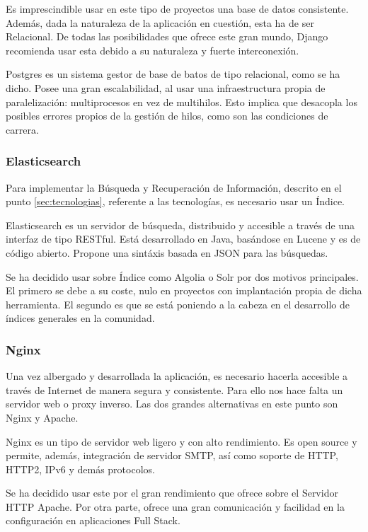 Es imprescindible usar en este tipo de proyectos una base de datos consistente. Además, dada la naturaleza de la aplicación en cuestión, esta ha de ser Relacional. De todas las posibilidades que ofrece este gran mundo, Django recomienda usar esta debido a su naturaleza y fuerte interconexión.

Postgres es un sistema gestor de base de batos de tipo relacional, como se ha dicho. Posee una gran escalabilidad, al usar una infraestructura propia de paralelización: multiprocesos en vez de multihilos. Esto implica que desacopla los posibles errores propios de la gestión de hilos, como son las condiciones de carrera.

\subsubsection{Elasticsearch}

Para implementar la Búsqueda y Recuperación de Información, descrito en el punto \ref{sec:tecnologias}, referente a las tecnologías, es necesario usar un Índice.

Elasticsearch es un servidor de búsqueda, distribuido y accesible a través de una interfaz de tipo RESTful. Está desarrollado en Java, basándose en Lucene y es de código abierto. Propone una sintáxis basada en JSON para las búsquedas.

Se ha decidido usar sobre Índice como Algolia o Solr por dos motivos principales. El primero se debe a su coste, nulo en proyectos con implantación propia de dicha herramienta. El segundo es que se está poniendo a la cabeza en el desarrollo de índices generales en la comunidad.

\subsubsection{Nginx}

Una vez albergado y desarrollada la aplicación, es necesario hacerla accesible a través de Internet de manera segura y consistente. Para ello nos hace falta un servidor web o proxy inverso. Las dos grandes alternativas en este punto son Nginx y Apache.

Nginx es un tipo de servidor web ligero y con alto rendimiento. Es open source y permite, además, integración de servidor SMTP, así como soporte de HTTP, HTTP2, IPv6 y demás protocolos.

Se ha decidido usar este por el gran rendimiento que ofrece sobre el Servidor HTTP Apache. Por otra parte, ofrece una gran comunicación y facilidad en la configuración en aplicaciones Full Stack.

